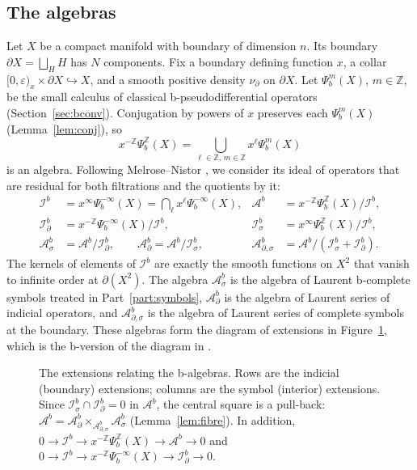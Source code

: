 \documentclass[11pt,oneside,reqno]{article}
\newcommand{\Z}{\mathbb Z}
\newcommand{\Ib}{\mathcal I^b}
\newcommand{\Idb}{\mathcal I^b_\partial}
\newcommand{\Isb}{\mathcal I^b_\sigma}
\newcommand{\Ab}{\mathcal A^b}
\newcommand{\Asb}{\mathcal A^b_\sigma}
\newcommand{\Adb}{\mathcal A^b_\partial}
\newcommand{\Adsb}{\mathcal A^b_{\partial,\sigma}}
\theoremstyle{plain}
\theoremstyle{definition}
\theoremstyle{remark}
\begin{document}
\subsection{The algebras}\label{subsec:algebras}
Let \(X\) be a compact manifold with boundary of dimension \(n\). Its
boundary \(\partial X=\bigsqcup_{H}H\) has \(N\) components. Fix a
boundary defining function \(x\), a collar
\([0,\varepsilon)_x\times\partial X\hookrightarrow X\), and a smooth positive
density \(\nu_\partial\) on \(\partial X\). Let \(\Psi_b^m(X)\), \(m\in\Z\),
be the small calculus of classical b-pseudodifferential operators
(Section~\ref{sec:bconv}). Conjugation by powers of \(x\) preserves each
\(\Psi_b^m(X)\) (Lemma~\ref{lem:conj}), so
\[
 x^{-\Z}\Psi_b^{\Z}(X)=\bigcup_{\ell\in\Z,\,m\in\Z}x^{\ell}\Psi_b^m(X)
\]
is an algebra. Following Melrose--Nistor \cite[(8)--(10)]{MN}, we consider
its ideal of operators that are residual for both filtrations and the
quotients by it:
\begin{align*}
 \Ib&=x^\infty\Psi_b^{-\infty}(X)=\bigcap_{\ell}x^\ell\Psi_b^{-\infty}(X),
 &\Ab&=x^{-\Z}\Psi_b^{\Z}(X)/\Ib,\\
 \Idb&=x^{-\Z}\Psi_b^{-\infty}(X)/\Ib,
 &\Isb&=x^{\infty}\Psi_b^{\Z}(X)/\Ib,\\
 \Asb&=\Ab/\Idb,\qquad \Adb=\Ab/\Isb,
 &\Adsb&=\Ab/(\Isb+\Idb).
\end{align*}
The kernels of elements of \(\Ib\) are exactly the smooth functions on
\(X^2\) that vanish to infinite order at \(\partial(X^2)\). The algebra
\(\Asb\) is the algebra of Laurent b-complete symbols treated in
Part~\ref{part:symbols}, \(\Adb\) is the algebra of Laurent series of
indicial operators, and \(\Adsb\) is the algebra of Laurent series of
complete symbols at the boundary. These algebras form the diagram of
extensions in Figure~\ref{fig:extensions}, which is the b-version of the
diagram in \cite[p.~4]{MN}.

\begin{figure}[htbp]
\centering
{}
\caption[The diagram of extensions]{The extensions relating the b-algebras.
Rows are the indicial (boundary) extensions; columns are the symbol
(interior) extensions. Since \(\Isb\cap\Idb=0\) in \(\Ab\), the central
square is a pull-back: \(\Ab=\Adb\times_{\Adsb}\Asb\)
(Lemma~\ref{lem:fibre}). In addition,
\(0\to\Ib\to x^{-\Z}\Psi_b^{\Z}(X)\to\Ab\to0\) and
\(0\to\Ib\to x^{-\Z}\Psi_b^{-\infty}(X)\to\Idb\to0\).}
\label{fig:extensions}
\end{figure}
\end{document}
